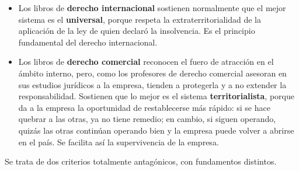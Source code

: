 \documentclass[12pt,oneside]{book}
\begin{document}
\begin{itemize}
    \item Los libros de \textbf{derecho internacional} sostienen normalmente que el mejor sistema es el \textbf{universal}, porque respeta la extraterritorialidad de la aplicación de la ley de quien declaró la insolvencia. Es el principio fundamental del derecho internacional.
    \item Los libros de \textbf{derecho comercial} reconocen el fuero de atracción en el ámbito interno, pero, como los profesores de derecho comercial asesoran en sus estudios jurídicos a la empresa, tienden a protegerla y a no extender la responsabilidad. Sostienen que lo mejor es el sistema \textbf{territorialista}, porque da a la empresa la oportunidad de restablecerse más rápido: si se hace quebrar a las otras, ya no tiene remedio; en cambio, si siguen operando, quizás las otras continúan operando bien y la empresa puede volver a abrirse en el país. Se facilita así la supervivencia de la empresa.
\end{itemize}

Se trata de dos criterios totalmente antagónicos, con fundamentos distintos.
\end{document}
